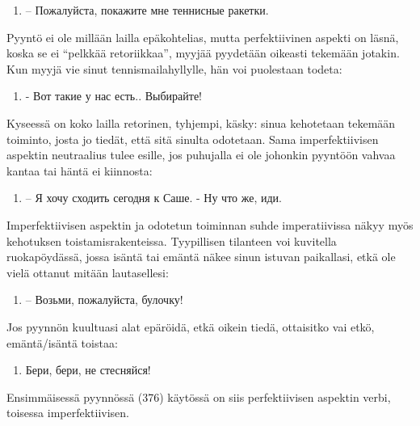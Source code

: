 \documentclass[]{scrartcl}
\providecommand{\tightlist}{%
  \setlength{\itemsep}{0pt}\setlength{\parskip}{0pt}}
\begin{document}
\begin{enumerate}
\def\labelenumi{(\arabic{enumi})}
\setcounter{enumi}{372}
\tightlist
\item
  -- Пожалуйста, покажите мне теннисные ракетки.
\end{enumerate}

Pyyntö ei ole millään lailla epäkohtelias, mutta perfektiivinen aspekti
on läsnä, koska se ei ``pelkkää retoriikkaa'', myyjää pyydetään oikeasti
tekemään jotakin. Kun myyjä vie sinut tennismailahyllylle, hän voi
puolestaan todeta:

\begin{enumerate}
\def\labelenumi{(\arabic{enumi})}
\setcounter{enumi}{373}
\tightlist
\item
  ­- Вот такие у нас есть.. Выбирайте!
\end{enumerate}

Kyseessä on koko lailla retorinen, tyhjempi, käsky: sinua kehotetaan
tekemään toiminto, josta jo tiedät, että sitä sinulta odotetaan. Sama
imperfektiivisen aspektin neutraalius tulee esille, jos puhujalla ei ole
johonkin pyyntöön vahvaa kantaa tai häntä ei kiinnosta:

\begin{enumerate}
\def\labelenumi{(\arabic{enumi})}
\setcounter{enumi}{374}
\tightlist
\item
  -- Я хочу сходить сегодня к Саше. - Ну что же, {иди.}
\end{enumerate}

Imperfektiivisen aspektin ja odotetun toiminnan suhde imperatiivissa
näkyy myös kehotuksen toistamisrakenteissa. Tyypillisen tilanteen voi
kuvitella ruokapöydässä, jossa isäntä tai emäntä näkee sinun istuvan
paikallasi, etkä ole vielä ottanut mitään lautasellesi:

\begin{enumerate}
\def\labelenumi{(\arabic{enumi})}
\setcounter{enumi}{375}
\tightlist
\item
  -- Возьми, пожалуйста, булочку!
\end{enumerate}

Jos pyynnön kuultuasi alat epäröidä, etkä oikein tiedä, ottaisitko vai
etkö, emäntä/isäntä toistaa:

\begin{enumerate}
\def\labelenumi{(\arabic{enumi})}
\setcounter{enumi}{376}
\tightlist
\item
  Бери, бери, не стесняйся!
\end{enumerate}

Ensimmäisessä pyynnössä (376) käytössä on siis perfektiivisen aspektin
verbi, toisessa imperfektiivisen.
\end{document}
